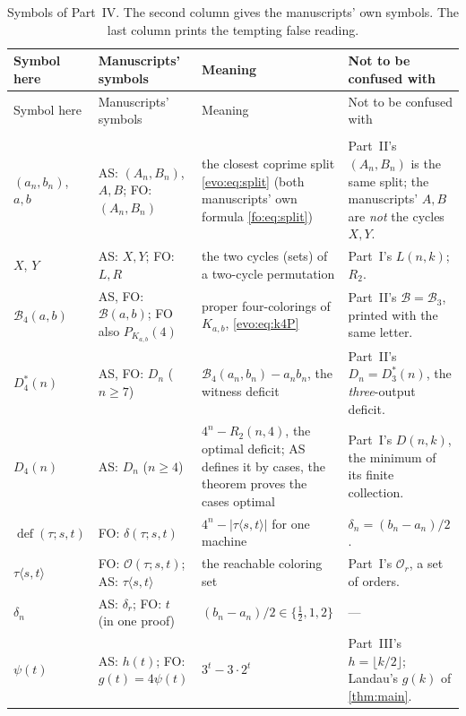 \documentclass[11pt,a4paper]{article}
\numberwithin{equation}{section}
\theoremstyle{definition}
\theoremstyle{remark}
\newcommand{\Bip}{\mathcal B}
\newcommand{\defi}{\operatorname{def}}
\begin{document}
{\small
\begin{longtable}{>{\raggedright}p{.15\linewidth}>{\raggedright}p{.21\linewidth}>{\raggedright}p{.26\linewidth}>{\raggedright\arraybackslash}p{.26\linewidth}}
\caption{Symbols of Part~IV. The second column gives the manuscripts' own
symbols. The last column prints the tempting false reading.}\label{fo:tab:notation}\\
\toprule
Symbol here & Manuscripts' symbols & Meaning & Not to be confused with\\
\midrule\endfirsthead
\toprule
Symbol here & Manuscripts' symbols & Meaning & Not to be confused with\\
\midrule\endhead
\midrule\multicolumn{4}{r}{\footnotesize Continued on next page}\\\endfoot
\bottomrule\endlastfoot
$(a_n,b_n)$, $a,b$ & AS: $(A_n,B_n)$, $A,B$; FO: $(A_n,B_n)$ & the closest
 coprime split \eqref{evo:eq:split} (both manuscripts' own formula
 \eqref{fo:eq:split}) & Part~II's $(A_n,B_n)$ is the same split; the
 manuscripts' $A,B$ are \emph{not} the cycles $X,Y$.\\
$X$, $Y$ & AS: $X,Y$; FO: $L,R$ & the two cycles (sets) of a two-cycle
 permutation & Part~I's $L(n,k)$; $R_2$.\\
$\Bip_4(a,b)$ & AS, FO: $\mathcal B(a,b)$; FO also $P_{K_{a,b}}(4)$ & proper
 four-colorings of $K_{a,b}$, \eqref{evo:eq:k4P} & Part~II's $\Bip=\Bip_3$,
 printed with the same letter.\\
$D^*_4(n)$ & AS, FO: $D_n$ ($n\ge7$) & $\Bip_4(a_n,b_n)-a_nb_n$, the witness
 deficit & Part~II's $D_n=D^*_3(n)$, the \emph{three}-output deficit.\\
$D_4(n)$ & AS: $D_n$ ($n\ge4$) & $4^n-R_2(n,4)$, the optimal deficit; AS
 defines it by cases, the theorem proves the cases optimal & Part~I's
 $D(n,k)$, the minimum of its finite collection.\\
$\defi(\tau;s,t)$ & FO: $\delta(\tau;s,t)$ & $4^n-|\tau\langle s,t\rangle|$
 for one machine & $\delta_n=(b_n-a_n)/2$.\\
$\tau\langle s,t\rangle$ & FO: $\mathcal O(\tau;s,t)$; AS: $\tau\langle s,t\rangle$ &
 the reachable coloring set & Part~I's $\mathcal O_r$, a set of orders.\\
$\delta_n$ & AS: $\delta_r$; FO: $t$ (in one proof) & $(b_n-a_n)/2\in\{\tfrac12,1,2\}$
 & ---\\
$\psi(t)$ & AS: $h(t)$; FO: $g(t)=4\psi(t)$ & $3^t-3\cdot2^t$ & Part~III's
 $h=\lfloor k/2\rfloor$; Landau's $g(k)$ of \cref{thm:main}.\\

\end{longtable}}
\end{document}
